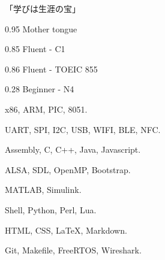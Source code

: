 \documentclass{faresume}
\begin{document}
\begin{column}[\rightcolumnwidth]


		\addcontent
		{
			{\Large\begin{CJK}{UTF8}{min}「学びは生涯の宝」\end{CJK}}
		}{}{}{}{}


		{}{}{}{}

		{}{}{}{}

		{}{}{}{}

		{}{}{}{}

		{}{}{}{}


			{0.95}
			{Mother tongue}
			{}{}{}

			{0.85}
			{Fluent - C1}
			{}{}{}

			{0.86}
			{Fluent - TOEIC 855}
			{}{}{}

			{0.28}
			{Beginner - N4}
			{}{}{}


			{x86, ARM, PIC, 8051.}
			{}{}{}{}

			{UART, SPI, I2C, USB, WIFI, BLE, NFC.}
			{}{}{}{}

			{Assembly, C, C++, Java, Javascript.}
			{}{}{}{}

			{ALSA, SDL, OpenMP, Bootstrap.}
			{}{}{}{}

			{MATLAB, Simulink.}
			{}{}{}{}

			{Shell, Python, Perl, Lua.}
			{}{}{}{}

			{HTML, CSS, {\LaTeX}, Markdown.}
			{}{}{}{}

			{Git, Makefile, FreeRTOS, Wireshark.}
			{}{}{}{}


\end{column}
\end{document}

